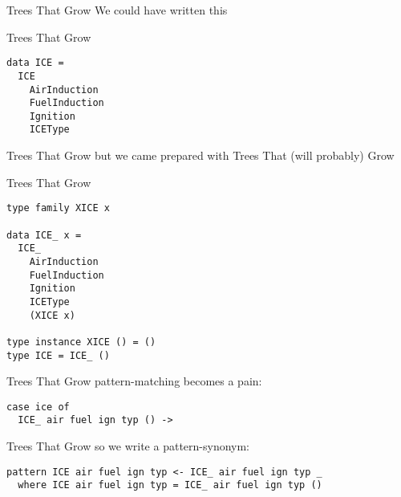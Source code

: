 \begin{frame}[fragile]
\begin{block}{Trees That Grow}
We could have written this
\end{block}
\end{frame}

\begin{frame}[fragile]
\begin{block}{Trees That Grow}
\begin{lstlisting}[style=haskell]
data ICE =
  ICE
    AirInduction
    FuelInduction
    Ignition
    ICEType
\end{lstlisting}
\end{block}
\end{frame}

\begin{frame}[fragile]
\begin{block}{Trees That Grow}
but we came prepared with Trees That (will probably) Grow
\end{block}
\end{frame}

\begin{frame}[fragile]
\begin{block}{Trees That Grow}
\begin{lstlisting}[style=haskell]
type family XICE x

data ICE_ x =
  ICE_
    AirInduction
    FuelInduction
    Ignition
    ICEType
    (XICE x)

type instance XICE () = ()
type ICE = ICE_ ()
\end{lstlisting}
\end{block}
\end{frame}

\begin{frame}[fragile]
\begin{block}{Trees That Grow}
pattern-matching becomes a pain:
\begin{lstlisting}[style=haskell]
case ice of
  ICE_ air fuel ign typ () -> 
\end{lstlisting}
\end{block}
\end{frame}

\begin{frame}[fragile]
\begin{block}{Trees That Grow}
so we write a pattern-synonym:
\begin{lstlisting}[style=haskell]
pattern ICE air fuel ign typ <- ICE_ air fuel ign typ _
  where ICE air fuel ign typ = ICE_ air fuel ign typ ()
\end{lstlisting}
\end{block}
\end{frame}
 
